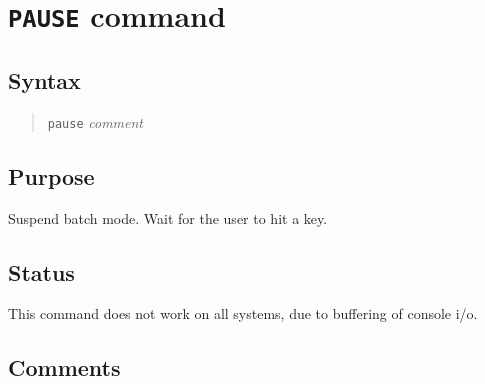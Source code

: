 %
%
%
%
\section{{\tt PAUSE} command}
\subsection{Syntax}
\begin{verse}
{\tt pause} {\it comment}
\end{verse}
\subsection{Purpose}

Suspend batch mode.  Wait for the user to hit a key.
\subsection{Status}

This command does not work on all systems, due to buffering of console i/o.
\subsection{Comments}

